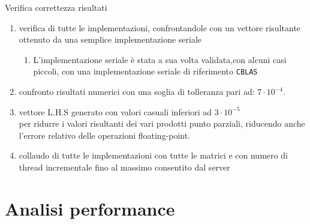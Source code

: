 \documentclass[aspectratio=1610]{beamer}
\newcommand{\vvv}[1]{{\small\texttt{#1}}}
\begin{document}
\begin{frame} {Verifica correttezza risultati}
	\begin{enumerate}
		\item	verifica di tutte le implementazioni, confrontandole con un vettore risultante
				ottenuto da una semplice implementazione seriale
		\begin{enumerate}
			\item	L'implementazione seriale è stata a sua volta validata,con alcuni casi piccoli,
					con una implementazione seriale di riferimento \vvv{CBLAS}
		\end{enumerate}
		\pause
		\item	confronto risultati numerici con una soglia di tolleranza pari ad: $7 \cdot 10^{-4}$. 
		\item	vettore L.H.S generato con valori casuali inferiori ad $3 \cdot 10^{-5}$\\
				per ridurre i valori risultanti dei vari prodotti punto parziali, 
				riducendo anche l'errore relativo delle operazioni floating-point.
		\pause
		\item	collaudo di tutte le implementazioni con tutte le matrici 
				e con numero di thread incrementale fino al massimo consentito dal server
	\end{enumerate}
\end{frame}
\section{Analisi performance}
\end{document}
